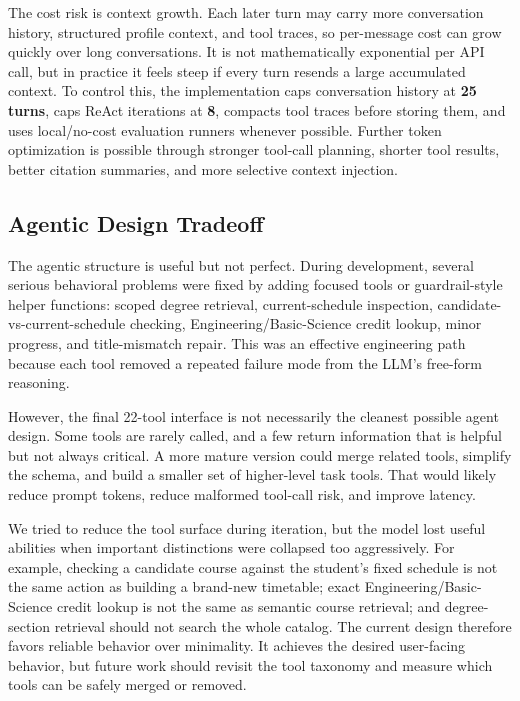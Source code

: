 \documentclass[10pt,letterpaper]{article}
\begin{document}
The cost risk is context growth. Each later turn may carry more conversation history, structured profile context, and tool traces, so per-message cost can grow quickly over long conversations. It is not mathematically exponential per API call, but in practice it feels steep if every turn resends a large accumulated context. To control this, the implementation caps conversation history at \textbf{25 turns}, caps ReAct iterations at \textbf{8}, compacts tool traces before storing them, and uses local/no-cost evaluation runners whenever possible. Further token optimization is possible through stronger tool-call planning, shorter tool results, better citation summaries, and more selective context injection.

\subsection{Agentic Design Tradeoff}
The agentic structure is useful but not perfect. During development, several serious behavioral problems were fixed by adding focused tools or guardrail-style helper functions: scoped degree retrieval, current-schedule inspection, candidate-vs-current-schedule checking, Engineering/Basic-Science credit lookup, minor progress, and title-mismatch repair. This was an effective engineering path because each tool removed a repeated failure mode from the LLM's free-form reasoning.

However, the final 22-tool interface is not necessarily the cleanest possible agent design. Some tools are rarely called, and a few return information that is helpful but not always critical. A more mature version could merge related tools, simplify the schema, and build a smaller set of higher-level task tools. That would likely reduce prompt tokens, reduce malformed tool-call risk, and improve latency.

We tried to reduce the tool surface during iteration, but the model lost useful abilities when important distinctions were collapsed too aggressively. For example, checking a candidate course against the student's fixed schedule is not the same action as building a brand-new timetable; exact Engineering/Basic-Science credit lookup is not the same as semantic course retrieval; and degree-section retrieval should not search the whole catalog. The current design therefore favors reliable behavior over minimality. It achieves the desired user-facing behavior, but future work should revisit the tool taxonomy and measure which tools can be safely merged or removed.
\end{document}
